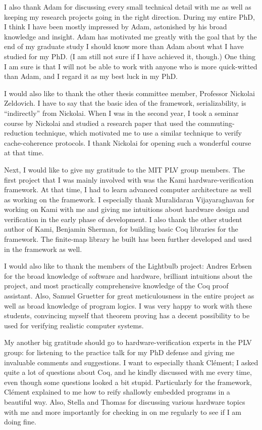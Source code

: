 I also thank Adam for discussing every small technical detail with me as well as keeping my research projects going in the right direction.
During my entire PhD, I think I have been mostly impressed by Adam, astonished by his broad knowledge and insight.
Adam has motivated me greatly with the goal that by the end of my graduate study I should know more than Adam about what I have studied for my PhD.
(I am still not sure if I have achieved it, though.)
One thing I am sure is that I will not be able to work with anyone who is more quick-witted than Adam, and I regard it as my best luck in my PhD.

I would also like to thank the other thesis committee member, Professor Nickolai Zeldovich.
I have to say that the basic idea of the \hemiola{} framework, serializability, is ``indirectly'' from Nickolai.
When I was in the second year, I took a seminar course by Nickolai and studied a research paper that used the commuting-reduction technique, which motivated me to use a similar technique to verify cache-coherence protocols.
I thank Nickolai for opening such a wonderful course at that time.

Next, I would like to give my gratitude to the MIT PLV group members.
The first project that I was mainly involved with was the Kami hardware-verification framework.
At that time, I had to learn advanced computer architecture as well as working on the framework.
I especially thank Muralidaran Vijayaraghavan for working on Kami with me and giving me intuitions about hardware design and verification in the early phase of development.
I also thank the other student author of Kami, Benjamin Sherman, for building basic Coq libraries for the framework.
The finite-map library he built has been further developed and used in the \hemiola{} framework as well.

I would also like to thank the members of the Lightbulb project: Andres Erbsen for the broad knowledge of software and hardware, brilliant intuitions about the project, and most practically comprehensive knowledge of the Coq proof assistant.
Also, Samuel Gruetter for great meticulousness in the entire project as well as broad knowledge of program logics.
I was very happy to work with these students, convincing myself that theorem proving has a decent possibility to be used for verifying realistic computer systems.

My another big gratitude should go to hardware-verification experts in the PLV group:  for listening to the practice talk for my PhD defense and giving me invaluable comments and suggestions.
I want to especially thank Cl\'ement; I asked quite a lot of questions about Coq, and he kindly discussed with me every time, even though some questions looked a bit stupid.
Particularly for the \hemiola{} framework, Cl\'ement explained to me how to reify shallowly embedded programs in a beautiful way.
Also, Stella and Thomas for discussing various hardware topics with me and more importantly for checking in on me regularly to see if I am doing fine.

